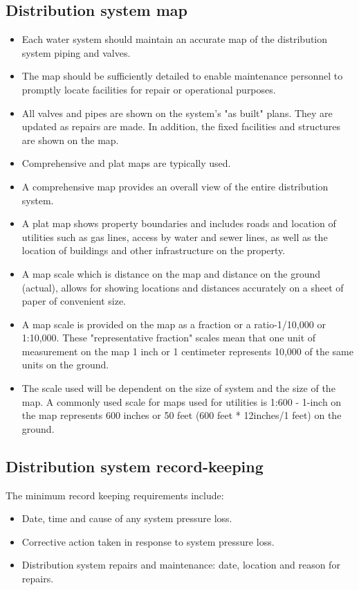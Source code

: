 \subsection{Distribution system map} 
\begin{itemize}
\item Each water system should maintain an accurate map of the distribution system piping and valves. 
\item The map should be sufficiently detailed to enable maintenance personnel to promptly locate facilities for repair or operational purposes.
\item All valves and pipes are shown on the system's "as built" plans.  They are updated as repairs are made.  In addition, the fixed facilities and structures are shown on the map.
\item Comprehensive  and plat maps are typically used.
\item A comprehensive map provides an overall view of the entire distribution system.
\item A plat map  shows property boundaries and includes roads and location of utilities such as gas lines, access by water and sewer lines, as well as the location of buildings and other infrastructure on the property.
\item A map scale which is distance on the map and distance on the ground (actual), allows for showing locations and distances accurately on a sheet of paper of convenient size. 
\item A map scale is provided on the map as a fraction or a ratio-1/10,000 or 1:10,000. These "representative fraction" scales mean that one unit of measurement on the map 1 inch or 1 centimeter represents 10,000 of the same units on the ground.
\item The scale used will be dependent on the size of system and the size of the map.  A commonly used scale for maps used for utilities is 1:600 - 1-inch on the map represents 600 inches or 50 feet (600 feet * 12inches/1 feet) on the ground.
\end{itemize}

\subsection{Distribution system record-keeping} 
The minimum record keeping requirements include:
\begin{itemize}
\item Date, time and cause of any system pressure loss.
\item Corrective action taken in response to system pressure loss.
\item Distribution system repairs and maintenance: date, location and reason for repairs.
\end{itemize}

